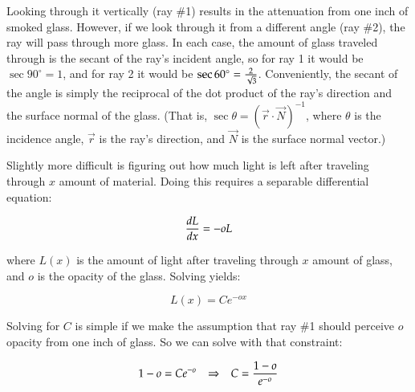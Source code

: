 \documentclass{report}
\newcommand{\degrees}{^\circ}
\begin{document}
      Looking through it vertically (ray \#1) results in the attenuation from one inch of smoked glass. However, if we look through it from a different angle
      (ray \#2), the ray will pass through more glass. In each case, the amount of glass traveled through is the secant of the ray's incident angle, so for ray
      1 it would be $\sec 90\degrees = 1$, and for ray 2 it would be $\sec 60\degrees = {2 \over \sqrt 3}$. Conveniently, the secant of the angle is simply the
      reciprocal of the dot product of the ray's direction and the surface normal of the glass. (That is, $\sec\theta = (\vec r \cdot \vec N)^{-1}$, where
      $\theta$ is the incidence angle, $\vec r$ is the ray's direction, and $\vec N$ is the surface normal vector.)

      Slightly more difficult is figuring out how much light is left after traveling through $x$ amount of material. Doing this requires a separable
      differential equation:

      $$
      {dL \over dx} = - o L
      $$

      \noindent where $L(x)$ is the amount of light after traveling through $x$ amount of glass, and $o$ is the opacity of the glass. Solving yields:

      $$
      L(x) = C e^{-o x}
      $$

      \noindent Solving for $C$ is simple if we make the assumption that ray \#1 should perceive $o$ opacity from one inch of glass. So we can solve with that
      constraint:

      $$
      1 - o = Ce^{-o} ~~~ \Rightarrow ~~~ C = {1 - o \over e^{-o}}
      $$
\end{document}

